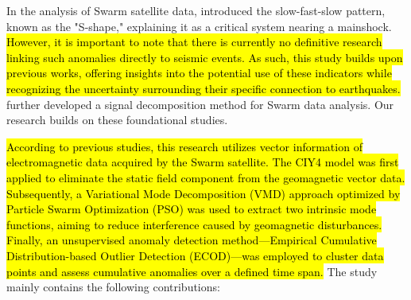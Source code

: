 \documentclass[3p,authoryear,preprint,12pt]{elsarticle}
\begin{document}
In the analysis of Swarm satellite data, \citep{desantisPotentialEarthquakePrecursory2017} introduced the slow-fast-slow pattern, known as the "S-shape," explaining it as a critical system nearing a mainshock. 
\hl{However, it is important to note that there is currently no definitive research linking such anomalies directly to seismic events. As such, this study builds upon previous works, offering insights into the potential use of these indicators while recognizing the uncertainty surrounding their specific connection to earthquakes.}
 \citep{fanAnalysisSwarmSatellite2022a} further developed a signal decomposition method for Swarm data analysis. Our research builds on these foundational studies.

\hl{According to previous studies, this research utilizes vector information of electromagnetic data acquired by the Swarm satellite. The CIY4 model was first applied to eliminate the static field component from the geomagnetic vector data. Subsequently, a Variational Mode Decomposition (VMD) approach optimized by Particle Swarm Optimization (PSO) was used to extract two intrinsic mode functions, aiming to reduce interference caused by geomagnetic disturbances. Finally, an unsupervised anomaly detection method—Empirical Cumulative Distribution-based Outlier Detection (ECOD)—was employed to cluster data points and assess cumulative anomalies over a defined time span.}
The study mainly contains the following contributions:
\end{document}
